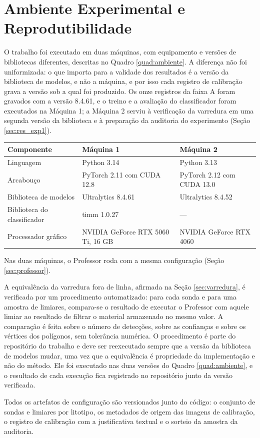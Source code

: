 \section{Ambiente Experimental e Reprodutibilidade}
\label{sec:verificacao}

O trabalho foi executado em duas máquinas, com equipamento e versões de bibliotecas diferentes, descritas no Quadro \ref{quad:ambiente}. A diferença não foi uniformizada: o que importa para a validade dos resultados é a versão da biblioteca de modelos, e não a máquina, e por isso cada registro de calibração grava a versão sob a qual foi produzido. Os onze registros da faixa A foram gravados com a versão 8.4.61, e o treino e a avaliação do classificador foram executados na Máquina 1; a Máquina 2 serviu à verificação da varredura em uma segunda versão da biblioteca e à preparação da auditoria do experimento (Seção \ref{sec:res_exp1}).

\begin{quadro}[ht]
  \caption{Ambientes de execução.}
  \label{quad:ambiente}
  \centering
  \begin{tabularx}{\textwidth}{lXX}
    \hline
    \bfseries Componente & \bfseries Máquina 1 & \bfseries Máquina 2 \\
    \hline
    Linguagem             & Python 3.14 & Python 3.13 \\
    Arcabouço             & PyTorch 2.11 \cite{pytorch_paszke2019} com CUDA 12.8 & PyTorch 2.12 com CUDA 13.0 \\
    Biblioteca de modelos & Ultralytics 8.4.61 & Ultralytics 8.4.52 \\
    Biblioteca do classificador & timm 1.0.27 & --- \\
    Processador gráfico   & NVIDIA GeForce RTX 5060 Ti, 16 GB & NVIDIA GeForce RTX 4060 \\
    \hline
  \end{tabularx}
\end{quadro}

Nas duas máquinas, o Professor roda com a mesma configuração (Seção \ref{sec:professor}).

A equivalência da varredura fora de linha, afirmada na Seção \ref{sec:varredura}, é verificada por um procedimento automatizado: para cada sonda e para uma amostra de limiares, compara-se o resultado de executar o Professor com aquele limiar ao resultado de filtrar o material armazenado no mesmo valor. A comparação é feita sobre o número de detecções, sobre as confianças e sobre os vértices dos polígonos, sem tolerância numérica. O procedimento é parte do repositório do trabalho e deve ser reexecutado sempre que a versão da biblioteca de modelos mudar, uma vez que a equivalência é propriedade da implementação e não do método. Ele foi executado nas duas versões do Quadro \ref{quad:ambiente}, e o resultado de cada execução fica registrado no repositório junto da versão verificada.

Todos os artefatos de configuração são versionados junto do código: o conjunto de sondas e limiares por litotipo, os metadados de origem das imagens de calibração, o registro de calibração com a justificativa textual e o sorteio da amostra da auditoria.
